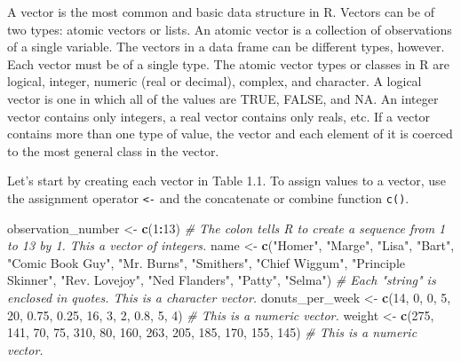 \documentclass[]{book}
\newenvironment{Shaded}{\begin{snugshade}}{\end{snugshade}}
\newcommand{\CommentTok}[1]{\textcolor[rgb]{0.56,0.35,0.01}{\textit{#1}}}
\newcommand{\DecValTok}[1]{\textcolor[rgb]{0.00,0.00,0.81}{#1}}
\newcommand{\FloatTok}[1]{\textcolor[rgb]{0.00,0.00,0.81}{#1}}
\newcommand{\KeywordTok}[1]{\textcolor[rgb]{0.13,0.29,0.53}{\textbf{#1}}}
\newcommand{\NormalTok}[1]{#1}
\newcommand{\OperatorTok}[1]{\textcolor[rgb]{0.81,0.36,0.00}{\textbf{#1}}}
\newcommand{\StringTok}[1]{\textcolor[rgb]{0.31,0.60,0.02}{#1}}
\begin{document}
A vector is the most common and basic data structure in R. Vectors can be of two types: atomic vectors or lists. An atomic vector is a collection of observations of a single variable. The vectors in a data frame can be different types, however. Each vector must be of a single type. The atomic vector types or classes in R are logical, integer, numeric (real or decimal), complex, and character. A logical vector is one in which all of the values are TRUE, FALSE, and NA. An integer vector contains only integers, a real vector contains only reals, etc. If a vector contains more than one type of value, the vector and each element of it is coerced to the most general class in the vector.

Let's start by creating each vector in Table 1.1. To assign values to a vector, use the assignment operator \texttt{\textless{}-} and the concatenate or combine function \texttt{c()}.

\begin{Shaded}
\begin{Highlighting}[]
\NormalTok{observation_number <-}\StringTok{ }\KeywordTok{c}\NormalTok{(}\DecValTok{1}\OperatorTok{:}\DecValTok{13}\NormalTok{) }\CommentTok{# The colon tells R to create a sequence from 1 to 13 by 1.  This a vector of integers.}
\NormalTok{name <-}\StringTok{ }\KeywordTok{c}\NormalTok{(}\StringTok{"Homer"}\NormalTok{, }\StringTok{"Marge"}\NormalTok{, }\StringTok{"Lisa"}\NormalTok{, }\StringTok{"Bart"}\NormalTok{, }\StringTok{"Comic Book Guy"}\NormalTok{, }\StringTok{"Mr. Burns"}\NormalTok{,}
          \StringTok{"Smithers"}\NormalTok{, }\StringTok{"Chief Wiggum"}\NormalTok{, }\StringTok{"Principle Skinner"}\NormalTok{, }\StringTok{"Rev. Lovejoy"}\NormalTok{,}
          \StringTok{"Ned Flanders"}\NormalTok{, }\StringTok{"Patty"}\NormalTok{, }\StringTok{"Selma"}\NormalTok{)  }\CommentTok{# Each "string" is enclosed in quotes.  This is a character vector.}
\NormalTok{donuts_per_week <-}\StringTok{ }\KeywordTok{c}\NormalTok{(}\DecValTok{14}\NormalTok{, }\DecValTok{0}\NormalTok{, }\DecValTok{0}\NormalTok{, }\DecValTok{5}\NormalTok{, }\DecValTok{20}\NormalTok{, }\FloatTok{0.75}\NormalTok{, }\FloatTok{0.25}\NormalTok{, }\DecValTok{16}\NormalTok{, }\DecValTok{3}\NormalTok{, }\DecValTok{2}\NormalTok{, }\FloatTok{0.8}\NormalTok{, }\DecValTok{5}\NormalTok{, }\DecValTok{4}\NormalTok{) }\CommentTok{# This is a numeric vector.}
\NormalTok{weight <-}\StringTok{ }\KeywordTok{c}\NormalTok{(}\DecValTok{275}\NormalTok{, }\DecValTok{141}\NormalTok{, }\DecValTok{70}\NormalTok{, }\DecValTok{75}\NormalTok{, }\DecValTok{310}\NormalTok{, }\DecValTok{80}\NormalTok{, }\DecValTok{160}\NormalTok{, }\DecValTok{263}\NormalTok{, }\DecValTok{205}\NormalTok{, }\DecValTok{185}\NormalTok{, }\DecValTok{170}\NormalTok{, }\DecValTok{155}\NormalTok{, }\DecValTok{145}\NormalTok{) }\CommentTok{# This is a numeric vector.}
\end{Highlighting}
\end{Shaded}
\end{document}
